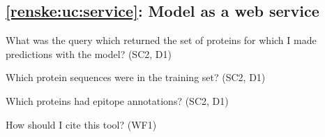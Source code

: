 \subsection{\ref{renske:uc:service}: Model as a web service}

\begin{provquestions}[resume]
    \item What was the query which returned the set of proteins for which I made predictions with the model? (SC2, D1)
    \item Which protein sequences were in the training set? (SC2, D1)
    \item Which proteins had epitope annotations? (SC2, D1)
    \item How should I cite this tool? (WF1)
\end{provquestions}
